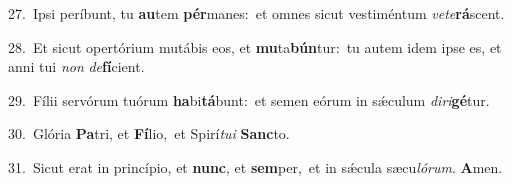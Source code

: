 {\numbfont\textcolor{\numbcolor}{27.}}~Ipsi períbunt, tu \textbf{au}\-tem \textbf{pér}\-manes:~\star et omnes sicut vestiméntum \textit{ve}\-\textit{te}\textbf{rá}scent.\par
{\numbfont\textcolor{\numbcolor}{28.}}~Et sicut opertórium mutábis eos, et \textbf{mu}\-ta\-\textbf{bún}\-tur:~\star tu autem idem ipse es, et anni tui \textit{non} \textit{de}\-\textbf{fí}cient.\par
{\numbfont\textcolor{\numbcolor}{29.}}~Fílii servórum tuórum \textbf{ha}\-bi\-\textbf{tá}\-bunt:~\star et semen eórum in sǽculum \textit{di}\-\textit{ri}\textbf{gé}tur.\par
{\numbfont\textcolor{\numbcolor}{30.}}~Glória \textbf{Pa}\-tri, et \textbf{Fí}\-lio,~\star et Spirí\-\textit{tu}\-\textit{i} \textbf{Sanc}\-to.\par
{\numbfont\textcolor{\numbcolor}{31.}}~Sicut erat in princípio, et \textbf{nunc}\-, et \textbf{sem}\-per,~\star et in sǽcula sæcu\-\textit{ló}\-\textit{rum}. \textbf{A}\-men.\par
